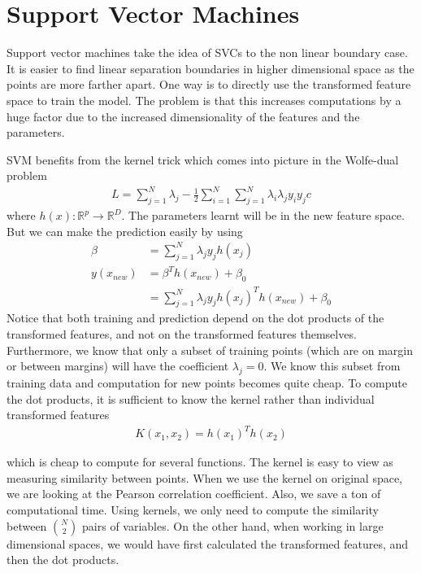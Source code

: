 \documentclass[../statistical_learning_notes.tex]{subfiles}
\begin{document}
    \section{Support Vector Machines}
    Support vector machines take the idea of SVCs to the non linear boundary case. It is easier to find linear separation boundaries in higher dimensional space as the points are more farther apart. One way is to directly use the transformed feature space to train the model. The problem is that this increases computations by a huge factor due to the increased dimensionality of the features and the parameters.\newline

    SVM benefits from the kernel trick which comes into picture in the Wolfe-dual problem
    \begin{align*}
        L = \sum_{j=1}^{N}\lambda_{j} - \frac{1}{2} \sum_{i=1}^{N}\sum_{j=1}^{N} \lambda_{i}\lambda_{j}y_{i}y_{j}c
    \end{align*}
    where $h(x):\mathbb{R}^{p} \rightarrow \mathbb{R}^D$. The parameters learnt will be in the new feature space. But we can make the prediction easily by using
    \begin{align*}
        \beta &= \sum_{j=1}^{N} \lambda_{j}y_{j}h(x_{j})\\
        y(x_{new}) &= \beta^{T}h(x_{new}) + \beta_{0}\\
        &= \sum_{j=1}^{N} \lambda_{j}y_{j}h(x_{j})^{T}h(x_{new}) + \beta_{0}
    \end{align*}
    Notice that both training and prediction depend on the dot products of the transformed features, and not on the transformed features themselves. Furthermore, we know that only a subset of training points (which are on margin or between margins) will have the coefficient $\lambda_{j} = 0$. We know this subset from training data and computation for new points becomes quite cheap.\newline
    To compute the dot products, it is sufficient to know the kernel rather than individual transformed features
    \begin{align*}
        K(x_{1}, x_{2}) = h(x_{1})^{T}h(x_{2})
    \end{align*}
    
    which is cheap to compute for several functions. The kernel is easy to view as measuring similarity between points. When we use the kernel on original space, we are looking at the Pearson correlation coefficient. Also, we save a ton of computational time. Using kernels, we only need to compute the similarity between $\binom{N}{2}$ pairs of variables. On the other hand, when working in large dimensional spaces, we would have first calculated the transformed features, and then the dot products.\newline
\end{document}
